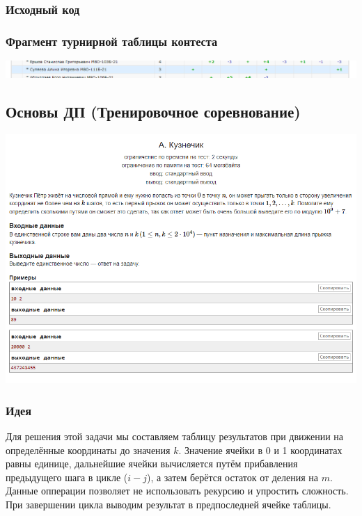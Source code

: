 \subsubsection*{Исходный код}



\subsubsection*{Фрагмент турнирной таблицы контеста}
\begin{center} 
\includegraphics[scale=0.5]{standings/5.png}\newline\noindent
\end{center}
\pagebreak


\subsection*{Основы ДП (Тренировочное соревнование)}
\begin{center} 
\includegraphics[scale=0.75]{statements/6_A.png}
\end{center} 
\subsubsection*{Идея}
Для решения этой задачи мы составляем таблицу результатов при движении на определённые координаты до значения $k$.
Значение ячейки в 0 и 1 координатах равны единице, дальнейшие ячейки вычисляется путём прибавления предыдущего шага в цикле ($i - j$), а затем берётся остаток от деления на $m$. Данные опперации позволяет не использовать рекурсию и упростить сложность. При завершении цикла выводим результат в предпоследней ячейке таблицы.
